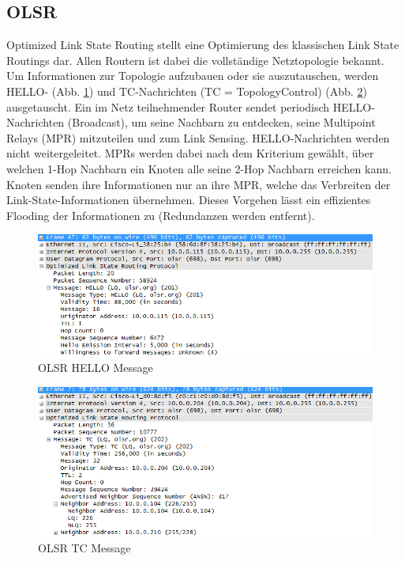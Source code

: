 \documentclass[10pt]{scrartcl}
\begin{document}
	\subsection{OLSR}
    Optimized Link State Routing stellt eine Optimierung des klassischen Link State Routings dar. Allen Routern ist dabei die vollständige Netztopologie bekannt. Um Informationen zur Topologie aufzubauen oder sie auszutauschen, werden HELLO- (Abb. \ref{img:olsr_hello_message}) und TC-Nachrichten (TC = TopologyControl) (Abb. \ref{img:olsr_tc_message}) ausgetauscht. Ein im Netz teilnehmender Router sendet periodisch HELLO-Nachrichten (Broadcast), um seine Nachbarn zu entdecken, seine Multipoint Relays (MPR) mitzuteilen und zum Link Sensing. HELLO-Nachrichten werden nicht weitergeleitet. MPRs werden dabei nach dem Kriterium gewählt, über welchen 1-Hop Nachbarn ein Knoten alle seine 2-Hop Nachbarn erreichen kann.
Knoten senden ihre Informationen nur an ihre MPR, welche das Verbreiten der Link-State-Informationen übernehmen. Dieses Vorgehen lässt ein effizientes Flooding der Informationen zu (Redundanzen werden entfernt).

	\begin{figure}
        \centering
                \includegraphics[width=\textwidth]{img/olsr_hello_message_example}
        \caption{OLSR HELLO Message}
        \label{img:olsr_hello_message}
	\end{figure}
	
	
	\begin{figure}
        \centering
                \includegraphics[width=\textwidth]{img/olsr_tc_message_example}
        \caption{OLSR TC Message}
        \label{img:olsr_tc_message}
	\end{figure}
	
\end{document}

